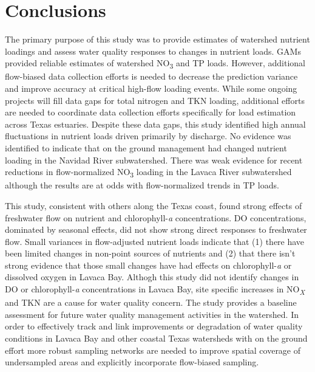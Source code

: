 \documentclass[fleqn,10pt,lineno]{wlpeerj} %
\begin{document}
\hypertarget{conclusions}{%
\section*{Conclusions}\label{conclusions}}

The primary purpose of this study was to provide estimates of watershed
nutrient loadings and assess water quality responses to changes in
nutrient loads. GAMs provided reliable estimates of watershed
NO\textsubscript{3} and TP loads. However, additional flow-biased data
collection efforts is needed to decrease the prediction variance and
improve accuracy at critical high-flow loading events. While some
ongoing projects will fill data gaps for total nitrogen and TKN loading,
additional efforts are needed to coordinate data collection efforts
specifically for load estimation across Texas estuaries. Despite these
data gaps, this study identified high annual fluctuations in nutrient
loads driven primarily by discharge. No evidence was identified to
indicate that on the ground management had changed nutrient loading in
the Navidad River subwatershed. There was weak evidence for recent
reductions in flow-normalized NO\textsubscript{3} loading in the Lavaca
River subwatershed although the results are at odds with flow-normalized
trends in TP loads.

This study, consistent with others along the Texas coast, found strong
effects of freshwater flow on nutrient and chlorophyll-\emph{a}
concentrations. DO concentrations, dominated by seasonal effects, did
not show strong direct responses to freshwater flow. Small variances in
flow-adjusted nutrient loads indicate that (1) there have been limited
changes in non-point sources of nutrients and (2) that there isn't
strong evidence that those small changes have had effects on
chlorophyll-\emph{a} or dissolved oxygen in Lavaca Bay. Althogh this
study did not identify changes in DO or chlorophyll-\emph{a}
concentrations in Lavaca Bay, site specific increases in
NO\textsubscript{\emph{X}} and TKN are a cause for water quality
concern. The study provides a baseline assessment for future water
quality management activities in the watershed. In order to effectively
track and link improvements or degradation of water quality conditions
in Lavaca Bay and other coastal Texas watersheds with on the ground
effort more robust sampling networks are needed to improve spatial
coverage of undersampled areas and explicitly incorporate flow-biased
sampling.
\end{document}
